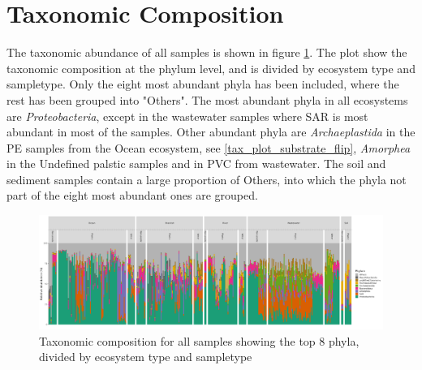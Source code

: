 \section{Taxonomic Composition}
The taxonomic abundance of all samples is shown in figure \ref{tax_plot}. The plot show the taxonomic composition at the phylum level, and is divided by ecosystem type and sampletype. Only the eight most abundant phyla has been included, where the rest has been grouped into "Others".
The most abundant phyla in all ecosystems are \emph{Proteobacteria}, except in the wastewater samples where SAR is most abundant in most of the samples.
Other abundant phyla are \emph{Archaeplastida} in the PE samples from the Ocean ecosystem, see \ref{tax_plot_substrate_flip}, \emph{Amorphea} in the Undefined palstic samples and in PVC from wastewater. The soil and sediment samples contain a large proportion of Others, into which the phyla not part of the eight most abundant ones are grouped. 




\begin{figure}[h]
    \centering
    \includegraphics[width = 0.9\textheight, angle = 90]{figure/tax_phylum_ecosystem_sampletype.png}
    \caption{Taxonomic composition for all samples showing the top 8 phyla, divided by ecosystem type and sampletype}
    \label{tax_plot}
\end{figure}












